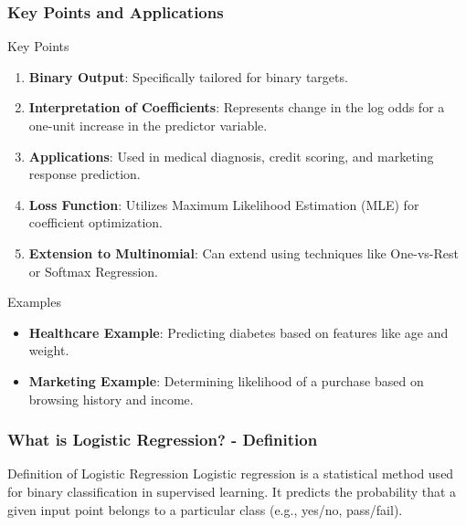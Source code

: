 \documentclass[aspectratio=169]{beamer}
\begin{document}
\begin{frame}[fragile]
    \frametitle{Key Points and Applications}
    \begin{block}{Key Points}
        \begin{enumerate}
            \item \textbf{Binary Output}: Specifically tailored for binary targets.
            \item \textbf{Interpretation of Coefficients}: Represents change in the log odds for a one-unit increase in the predictor variable.
            \item \textbf{Applications}: Used in medical diagnosis, credit scoring, and marketing response prediction.
            \item \textbf{Loss Function}: Utilizes Maximum Likelihood Estimation (MLE) for coefficient optimization.
            \item \textbf{Extension to Multinomial}: Can extend using techniques like One-vs-Rest or Softmax Regression.
        \end{enumerate}
    \end{block}
    \begin{block}{Examples}
        \begin{itemize}
            \item \textbf{Healthcare Example}: Predicting diabetes based on features like age and weight.
            \item \textbf{Marketing Example}: Determining likelihood of a purchase based on browsing history and income.
        \end{itemize}
    \end{block}
\end{frame}

\begin{frame}[fragile]
    \frametitle{What is Logistic Regression? - Definition}
    \begin{block}{Definition of Logistic Regression}
        Logistic regression is a statistical method used for binary classification in supervised learning. It predicts the probability that a given input point belongs to a particular class (e.g., yes/no, pass/fail).
    \end{block}
\end{frame}
\end{document}

